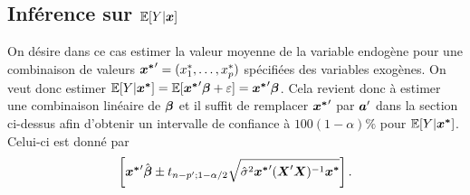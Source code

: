 \subsection{Inférence sur $\esp[Y|\bo{x}]$}
\label{sec:previsionRLM1}

On désire dans ce cas estimer la valeur moyenne de la
variable endog\`ene pour une combinaison de valeurs
$\bo{x^*}'=(x_1^*,\ldots,x_{p}^*)$ spécifiées des variables
exog\`enes. On veut donc estimer
$\esp[Y|\bo{x^*}]=\esp[\bo{x^*}'\bobeta+\varepsilon]=\bo{x^*}'\bobeta$.
Cela revient donc à estimer une combinaison linéaire de $\bobeta$ et il suffit de  remplacer $\bo{x^*}'$ par $\bo a'$ dans la section ci-dessus
afin d'obtenir un intervalle de confiance à $100(1-\alpha)\%$ pour $\esp[Y|\bo{x^*}]$.
Celui-ci est donné par
\begin{equation}\label{ci:EY}
\left[\displaystyle\bo{x^*}'\hbobeta\pm
t_{n-p'; 1-\alpha/2}\sqrt{\hat{\sigma}^2\bo{x^*}'(\boX'\boX)^{-1}\bo{x^*}}\right].
\end{equation}

